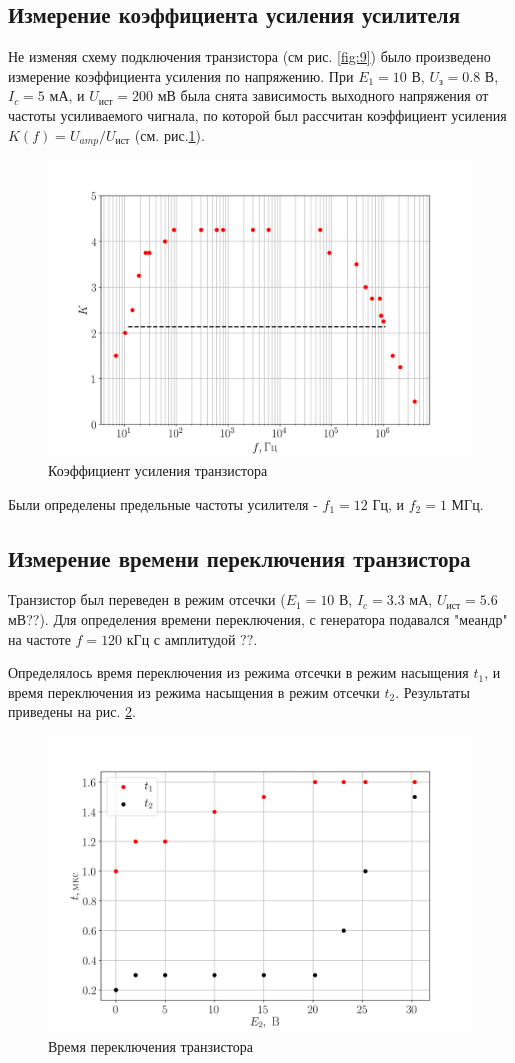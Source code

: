 \subsection{Измерение коэффициента усиления усилителя}
Не изменяя схему подключения транзистора (см рис. \ref{fig:9}) было произведено измерение коэффициента усиления по напряжению.
При $E_1 = 10$ В, $U_{\text{з}} = 0.8$ В, $I_c = 5$ мА, и $U_{\text{ист}} = 200$ мВ была снята зависимость
выходного напряжения от частоты усиливаемого чигнала, по которой был рассчитан коэффициент усиления $K(f) =
U_{amp}/U_{\text{ист}}$ (см. рис.\ref{fig:11}).

\begin{figure}[h!]
	\centering
	\includegraphics[width=0.8\linewidth]{fig/task4.png}
	\caption{Коэффициент усиления транзистора}
	\label{fig:11}
\end{figure}
Были определены предельные частоты усилителя - $f_1 = 12$ Гц, и $f_2 = 1$ МГц.

\subsection{Измерение времени переключения транзистора}
Транзистор был переведен в режим отсечки ($E_1 = 10$ В, $I_c = 3.3$ мА, $U_{\text{ист}} = 5.6$ мВ??). Для
определения времени переключения, с генератора подавался "меандр" на частоте $f = 120$ кГц с амплитудой $??$.

Определялось время переключения из режима отсечки в режим насыщения $t_1$, и время переключения из режима насыщения в
режим отсечки $t_2$. Результаты приведены на рис. \ref{fig:12}.
\begin{figure}[h!]
	\centering
	\includegraphics[width=0.8\linewidth]{fig/task6.png}
	\caption{Время переключения транзистора}
	\label{fig:12}
\end{figure}


